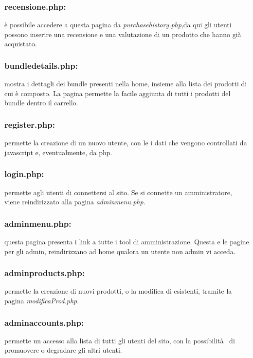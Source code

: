 \subsubsection{recensione.php:} \Spazio è possibile accedere a questa pagina da \textit{purchasehistory.php},da qui gli utenti possono inserire una recensione e una valutazione di un prodotto che hanno già  acquistato.

\subsubsection{bundledetails.php:} \Spazio mostra i dettagli dei bundle presenti nella home, insieme alla lista dei prodotti di cui è composto. La pagina permette la facile aggiunta di tutti i prodotti del bundle dentro il carrello.

\subsubsection{register.php:} \Spazio permette la creazione di un nuovo utente, con le i dati che vengono controllati da javascript e, eventualmente, da php.

\subsubsection{login.php:} \Spazio permette agli utenti di connettersi al sito. Se si connette un amministratore, viene reindirizzato alla pagina \textit{adminmenu.php}.

\subsubsection{adminmenu.php:} \Spazio questa pagina presenta i link a tutte i tool di amministrazione. Questa e le pagine per gli admin, reindirizzano ad home qualora un utente non admin vi acceda.

\subsubsection{adminproducts.php:} \Spazio permette la creazione di nuovi prodotti, o la modifica di esistenti, tramite la pagina \textit{modificaProd.php}.

\subsubsection{adminaccounts.php:} \Spazio permette un accesso alla lista di tutti gli utenti del sito, con la possibilità  di promuovere o degradare gli altri utenti.

